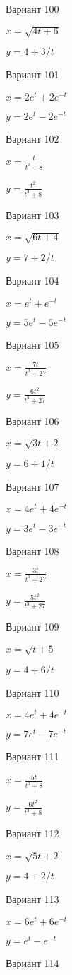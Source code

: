 \documentclass[11pt]{report}
\begin{document}
Вариант 100

$x = \sqrt{4 t + 6}$

$y = 4 + 3 / t$

Вариант 101

$x = 2 e^{t} + 2 e^{- t}$

$y = 2 e^{t} - 2 e^{- t}$

Вариант 102

$x = \frac{t}{t^{3} + 8}$

$y = \frac{t^{2}}{t^{3} + 8}$

Вариант 103

$x = \sqrt{6 t + 4}$

$y = 7 + 2 / t$

Вариант 104

$x = e^{t} + e^{- t}$

$y = 5 e^{t} - 5 e^{- t}$

Вариант 105

$x = \frac{7 t}{t^{3} + 27}$

$y = \frac{6 t^{2}}{t^{3} + 27}$

Вариант 106

$x = \sqrt{3 t + 2}$

$y = 6 + 1 / t$

Вариант 107

$x = 4 e^{t} + 4 e^{- t}$

$y = 3 e^{t} - 3 e^{- t}$

Вариант 108

$x = \frac{3 t}{t^{3} + 27}$

$y = \frac{5 t^{2}}{t^{3} + 27}$

Вариант 109

$x = \sqrt{t + 5}$

$y = 4 + 6 / t$

Вариант 110

$x = 4 e^{t} + 4 e^{- t}$

$y = 7 e^{t} - 7 e^{- t}$

Вариант 111

$x = \frac{5 t}{t^{3} + 8}$

$y = \frac{6 t^{2}}{t^{3} + 8}$

Вариант 112

$x = \sqrt{5 t + 2}$

$y = 4 + 2 / t$

Вариант 113

$x = 6 e^{t} + 6 e^{- t}$

$y = e^{t} - e^{- t}$

Вариант 114
\end{document}
